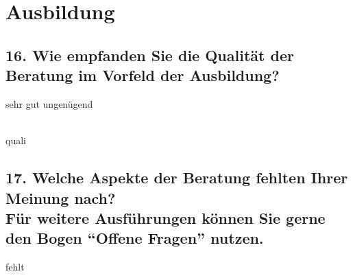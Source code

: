 \vspace{-.5cm}



\section*{Ausbildung}

\subsection*{16. Wie empfanden Sie die Qualität der Beratung im Vorfeld der Ausbildung?}
\vspace{0.1cm}
\hspace{2cm} sehr gut \hspace{7.5cm} ungenügend \\ \\
\begin{questionmult}{quali}
	\begin{choiceshoriz}
		\correctchoice{}
		\correctchoice{}
		\correctchoice{}
		\correctchoice{}
		\correctchoice{}
		\correctchoice{}
	\end{choiceshoriz}
\end{questionmult}

\subsection*{17. Welche Aspekte der Beratung fehlten Ihrer Meinung nach? \\
\small Für weitere Ausführungen können Sie gerne den Bogen ``Offene Fragen'' nutzen.}
\vspace{0.5cm}
\begin{questionmult}{fehlt}
	\begin{choices}
	\end{choices}
\end{questionmult}
